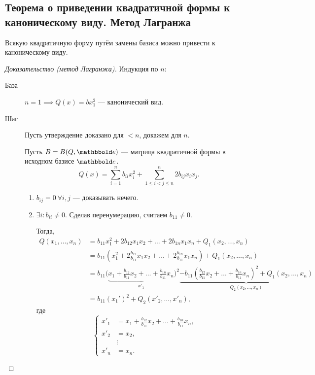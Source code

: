 \subsection{Теорема о приведении квадратичной формы к каноническому виду. Метод Лагранжа}

\begin{theorem}
    Всякую квадратичную форму путём замены базиса можно привести к каноническому виду.
\end{theorem}

\begin{proof}[Доказательство (метод Лагранжа)]
    Индукция по $n$:
    \begin{description}
    \item[База] $n = 1 \implies Q(x) = b x_1^2$ --- канонический вид.
    \item[Шаг] Пусть утверждение доказано для $< n$, докажем для $n$.

        Пусть $B = B(Q, \E)$ --- матрица квадратичной формы в исходном базисе $\E$.
        \begin{equation*}
            Q(x) = \sum_{i = 1}^{n} b_{ii} x_i^2 + \sum_{1 \leq i < j \leq n}^{n} 2 b_{ij} x_i x_j
        .\end{equation*}

        \begin{enumerate}[start=0,label=Случай \arabic*.]
        \item
            $b_{ij} = 0 \ \forall i, j$ --- доказывать нечего.
        \item
            $\exists i : b_{ii} \neq 0$. Сделав перенумерацию, считаем $b_{11} \neq 0$.

            Тогда,
            \begin{align*}
                Q(x_1, \dots, x_n)
                &= b_{11} x_1^2 + 2b_{12} x_1 x_2 + \dots + 2 b_{1n} x_1 x_n + Q_1(x_2, \dots, x_n) \\
                &= b_{11} \left(x_1^2 + 2\frac{b_{12}}{b_{11}} x_1 x_2 + \dots + 2\frac{b_{1n}}{b_{11}} x_1 x_n\right) + Q_1(x_2, \dots, x_n) \\
                &= b_{11} \Bigg(\underbrace{x_1 + \frac{b_{12}}{b_{11}} x_2 + \dots + \frac{b_{1n}}{b_{11}} x_n}_{x'_1}\Bigg)^2 \underbrace{ - b_{11} \left(\frac{b_{12}}{b_{11}}x_2 + \dots + \frac{b_{1n}}{b_{11}} x_n\right)^2 + Q_1(x_2, \dots, x_n)}_{Q_2(x_2, \dots, x_n)} \\
                &= b_{11} (x_1')^2 + Q_2 (x'_2, \dots, x'_n)
            ,\end{align*}
            где
            \begin{equation*}
                \begin{cases}
                    x'_1 &= x_1 + \frac{b_{12}}{b_{11}} x_2 + \dots + \frac{b_{1n}}{b_{11}} x_n, \\
                    x'_2 &= x_2, \\
                         &\vdots \\
                    x'_n &= x_n.
                \end{cases}
            \end{equation*}


\end{enumerate}
\end{description}
\end{proof}
